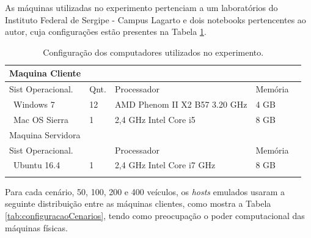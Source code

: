 \documentclass[
	12pt,				%
	oneside,			%
	a4paper,			%
	english,			%
	brazil				%
	]{abntex2ppgsi}
\begin{document}
As máquinas utilizadas no experimento pertenciam a um laboratórios do Instituto Federal de Sergipe - Campus Lagarto e dois notebooks pertencentes ao autor, cuja configurações estão presentes na Tabela \ref{tab:configuracaoMaquinas}.


\begin{longtable}{ |p{} |p{}  |p{}   |p{} | p{}} 
	\hline
	\rowcolor[gray]{0.7}
	 Maquina Cliente &	& 	&  \\ \hline
	\rowcolor[gray]{0.7}
	Sist Operacional.	& Qnt. & Processador	& Memória \\ \
	Windows 7	& 12 & AMD Phenom II X2 B57 3.20 GHz & 4 GB	\\ \
	Mac OS Sierra	& 1 & 2,4 GHz Intel Core i5	& 8 GB \\   \hline
	\rowcolor[gray]{0.7}
	 Maquina Servidora &	& 	&  \\ \hline
	\rowcolor[gray]{0.7}
	 Sist Operacional. &	& Processador	& Memória \\ \
	Ubuntu 16.4	& 1 & 2,4 GHz Intel Core i7 GHz & 8 GB	\\ \hline
	\caption{Configuração dos computadores utilizados no experimento. } 
	\label{tab:configuracaoMaquinas}
\end{longtable}

Para cada cenário, 50, 100, 200 e 400 veículos, os \textit{hosts} emulados usaram a seguinte distribuição entre as máquinas clientes, como mostra a Tabela \ref{tab:configuracaoCenarios}, tendo como preocupação o poder computacional das máquinas físicas.
%
\end{document}
